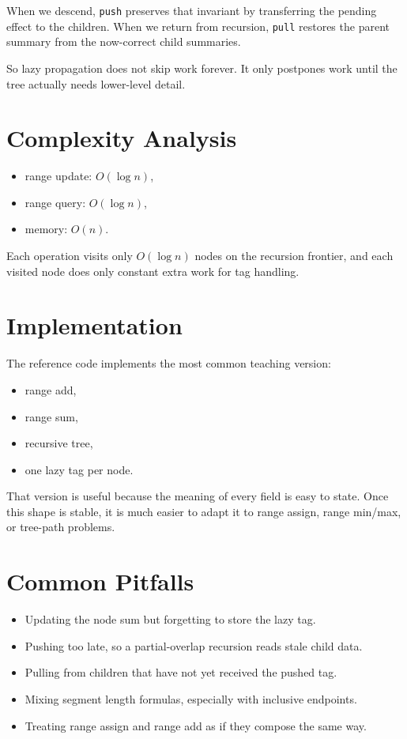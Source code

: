 When we descend, \texttt{push} preserves that invariant by transferring the pending effect to the children. When we
return from recursion, \texttt{pull} restores the parent summary from the now-correct child summaries.

So lazy propagation does not skip work forever. It only postpones work until the tree actually needs lower-level
detail.

\section*{Complexity Analysis}

\begin{itemize}
  \item range update: \(O(\log n)\),
  \item range query: \(O(\log n)\),
  \item memory: \(O(n)\).
\end{itemize}

Each operation visits only \(O(\log n)\) nodes on the recursion frontier, and each visited node does only constant
extra work for tag handling.

\section*{Implementation}

The reference code implements the most common teaching version:

\begin{itemize}
  \item range add,
  \item range sum,
  \item recursive tree,
  \item one lazy tag per node.
\end{itemize}

That version is useful because the meaning of every field is easy to state. Once this shape is stable, it is much
easier to adapt it to range assign, range min/max, or tree-path problems.

\section*{Common Pitfalls}

\begin{itemize}
  \item Updating the node sum but forgetting to store the lazy tag.
  \item Pushing too late, so a partial-overlap recursion reads stale child data.
  \item Pulling from children that have not yet received the pushed tag.
  \item Mixing segment length formulas, especially with inclusive endpoints.
  \item Treating range assign and range add as if they compose the same way.
\end{itemize}

